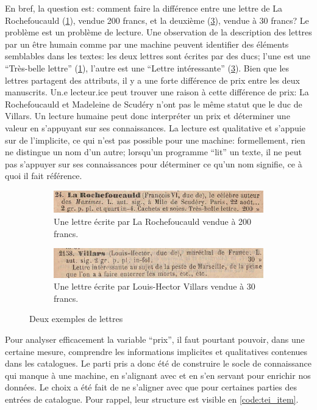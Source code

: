 En bref, la question est: comment faire la différence entre une lettre de La Rochefoucauld (\ref{fig:rochefoucauld}), vendue 200 francs, et la deuxième (\ref{fig:villars}), vendue à 30 francs? Le problème est un problème de lecture. Une observation de la description des lettres par un être humain comme par une machine peuvent identifier des éléments semblables dans les textes: les deux lettres sont écrites par des ducs; l'une est une \enquote{Très-belle lettre} (\ref{fig:rochefoucauld}), l'autre est une \enquote{Lettre intéressante} (\ref{fig:villars}). Bien que les lettres partagent des attributs, il y a une forte différence de prix entre les deux manuscrits. Un.e lecteur.ice peut trouver une raison à cette différence de prix: La Rochefoucauld et Madeleine de Scudéry n'ont pas le même statut que le duc de Villars. Un lecture humaine peut donc interpréter un prix et déterminer une valeur en s'appuyant sur ses connaissances. La lecture est qualitative et s'appuie sur de l'implicite, ce qui n'est pas possible pour une machine: formellement, rien ne distingue un nom d'un autre; lorsqu'un programme \enquote{lit} un texte, il ne peut pas s'appuyer sur ses connaissances pour déterminer ce qu'un nom signifie, ce à quoi il fait référence.

\begin{figure}[h!]
	\centering
	\begin{subfigure}{0.8\textwidth}
		\includegraphics[width=\textwidth]{img/cat_000372_e24.png}
		\caption{Une lettre écrite par La Rochefoucauld vendue à 200 francs.}
		\label{fig:rochefoucauld}
	\end{subfigure}
	\begin{subfigure}{0.8\textwidth}
		\includegraphics[width=\textwidth]{img/cat_000382_e2158.png}
		\caption{Une lettre écrite par Louis-Hector Villars vendue à 30 francs.}
		\label{fig:villars}
	\end{subfigure}
	\caption{Deux exemples de lettres}
\end{figure}

Pour analyser efficacement la variable \enquote{prix}, il faut pourtant pouvoir, dans une certaine mesure, comprendre les informations implicites et qualitatives contenues dans les catalogues. Le parti pris a donc été de construire le socle de connaissance qui manque à une machine, en s'alignant avec \wkd{} et en s'en servant pour enrichir nos données. Le choix a été fait de ne s'aligner avec \wkd{} que pour certaines parties des entrées de catalogue. Pour rappel, leur structure est visible en \ref{code:tei_item}.

